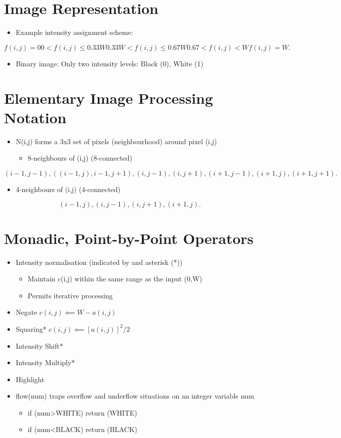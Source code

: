 \documentclass[a4paper]{article}
\begin{document}
	\section{Image Representation}
	\begin{itemize}
		\item Example intensity assignment scheme:
	\end{itemize}
	\[
		f(i,j) = 0
		0 < f(i,j) \le 0.33W
		0.33W < f(i,j) \le 0.67W
		0.67 < f(i,j) < W
		f(i,j) = W
	.\]
	\begin{itemize}
		\item Binary image: Only two intensity levels: Black (0), White (1)
	\end{itemize}
	\section{Elementary Image Processing Notation}
	\begin{itemize}
		\item N(i,j) forms a 3x3 set of pixels (neighbourhood) around pixel (i,j)
			\begin{itemize}
				\item 8-neighbours of (i,j) (8-connected)
			\end{itemize}
	\end{itemize}
	\[
	{(i-1, j-1),((i-1,j),i-1,j+1),(i,j-1),(i,j+1),(i+1,j-1),(i+1,j),(i+1,j+1)}
	.\]
	\begin{itemize}
		\begin{itemize}
			\item 4-neighbours of (i,j) (4-connected)
		\end{itemize}
	\end{itemize}
	\[
	{(i-1,j),(i,j-1),(i,j+1),(i+1,j)}
	.\]
	\section{Monadic, Point-by-Point Operators}
	\begin{itemize}
		\item Intensity normalisation (indicated by and asterisk (*))
		\begin{itemize}
			\item Maintain c(i,j) within the same range as the input (0,W)
			\item Permits iterative processing
		\end{itemize}
	\item Negate $c(i,j) \impliedby W-a(i,j)$
	\item Squaring* $c(i,j) \impliedby [a(i,j)]^2/2$
	\item Intensity Shift*
	\item Intensity Multiply*
	\item Highlight
	\item flow(num) traps overflow and underflow situations on an integer variable num
	\begin{itemize}
		\item if (num>WHITE) return (WHITE)
		\item if (num<BLACK) return (BLACK)
	\end{itemize}
	\end{itemize}
\end{document}
